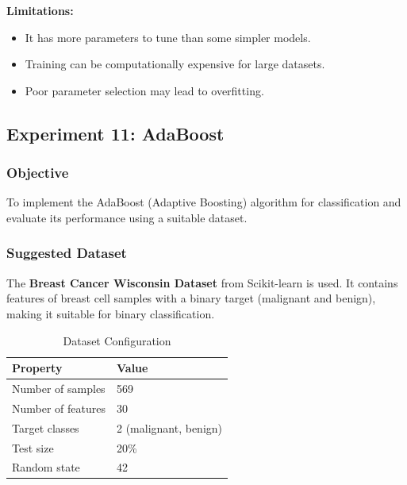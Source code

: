 \documentclass[a4paper,11pt]{article}
\begin{document}
\textbf{Limitations:}
\begin{itemize}
    \item It has more parameters to tune than some simpler models.
    \item Training can be computationally expensive for large datasets.
    \item Poor parameter selection may lead to overfitting.
\end{itemize}




\subsection{Experiment 11: AdaBoost}

\subsubsection{Objective}
To implement the AdaBoost (Adaptive Boosting) algorithm for classification and evaluate its performance using a suitable dataset.

\subsubsection{Suggested Dataset}
The \textbf{Breast Cancer Wisconsin Dataset} from Scikit-learn is used. It contains features of breast cell samples with a binary target (malignant and benign), making it suitable for binary classification.

\begin{table}[H]
\centering
\caption{Dataset Configuration}
\begin{tabular}{ll}
\toprule
\textbf{Property} & \textbf{Value} \\
\midrule
Number of samples  & 569 \\
Number of features & 30 \\
Target classes     & 2 (malignant, benign) \\
Test size          & 20\% \\
Random state       & 42 \\
\bottomrule
\end{tabular}
\end{table}
\end{document}
